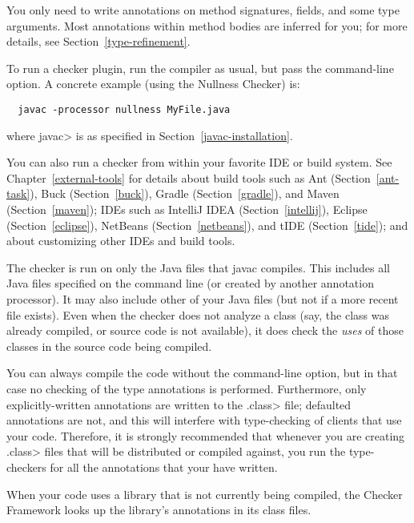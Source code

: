 You only need to write annotations on method signatures, fields, and some type arguments.
Most annotations within method bodies are inferred for you; for more details,
see  Section~\ref{type-refinement}.


To run a checker plugin, run the compiler  as usual,
but pass the  command-line
option.
A concrete example (using the Nullness Checker) is:

\begin{Verbatim}
  javac -processor nullness MyFile.java
\end{Verbatim}

\noindent
where \<javac> is as specified in Section~\ref{javac-installation}.

You can also run a checker from within your favorite IDE or build system.  See
Chapter~\ref{external-tools} for details about build tools such as
Ant (Section~\ref{ant-task}),
Buck (Section~\ref{buck}),
Gradle (Section~\ref{gradle}), and
Maven (Section~\ref{maven});
IDEs such as
IntelliJ IDEA (Section~\ref{intellij}),
Eclipse (Section~\ref{eclipse}),
NetBeans (Section~\ref{netbeans}),
and
tIDE (Section~\ref{tide});
and about customizing other IDEs and build tools.

The checker is run on only the Java files that javac compiles.
This includes all Java files specified on the command line (or
created by another annotation processor).  It may also include other of
your Java files (but not if a more recent  file exists).
Even when the checker does not analyze a class (say, the class was
already compiled, or source code is not available), it does check
the \emph{uses} of those classes in the source code being compiled.

You can always compile the code without the 
command-line option, but in that case no checking of the type
annotations is performed.  Furthermore, only explicitly-written annotations
are written to the \<.class> file; defaulted annotations are not, and this
will interfere with type-checking of clients that use your code.
Therefore, it is strongly recommended that whenever you are creating
\<.class> files that will be distributed or compiled against, you run the
type-checkers for all the annotations that your have written.



When your code uses a library that is not currently being compiled, the
Checker Framework looks up the library's annotations in its class files.

